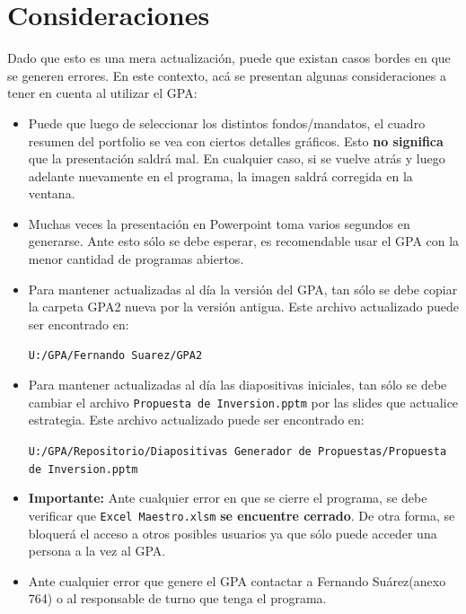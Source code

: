 \documentclass{article}
\begin{document}
\section{Consideraciones}

Dado que esto es una mera actualización, puede que existan casos bordes en que se generen errores. En este contexto, acá se presentan algunas consideraciones a tener en cuenta al utilizar el GPA:
\begin{itemize}

\item Puede que luego de seleccionar los distintos fondos/mandatos, el cuadro resumen del portfolio se vea con ciertos detalles gráficos. Esto \textbf{no significa} que la presentación saldrá mal. En cualquier caso, si se vuelve atrás y luego adelante nuevamente en el programa, la imagen saldrá corregida en la ventana.
\item Muchas veces la presentación en Powerpoint toma varios segundos en generarse. Ante esto sólo se debe esperar, es recomendable usar el GPA con la menor cantidad de programas abiertos.
\item Para mantener actualizadas al día la versión del GPA, tan sólo se debe copiar la carpeta GPA2 nueva por la versión antigua. Este archivo actualizado puede ser encontrado en: 
\begin{center}
\texttt{U:/GPA/Fernando Suarez/GPA2 } 
\end{center}
\item Para mantener actualizadas al día las diapositivas iniciales, tan sólo se debe cambiar el archivo \texttt{Propuesta de Inversion.pptm} por las slides que actualice estrategia. Este archivo actualizado puede ser encontrado en: 
\begin{center}
\texttt{U:/GPA/Repositorio/Diapositivas Generador de Propuestas/Propuesta de Inversion.pptm } 
\end{center}

\item \textbf{Importante: }Ante cualquier error en que se cierre el programa, se debe verificar que \texttt{Excel Maestro.xlsm} \textbf{se encuentre cerrado}. De otra forma, se bloquerá el acceso a otros posibles usuarios ya que sólo puede acceder una persona a la vez al GPA.
\item Ante cualquier error que genere el GPA contactar a Fernando Suárez(anexo 764) o al responsable de turno que tenga el programa.

\end{itemize}


%
%  
%   
\end{document}
